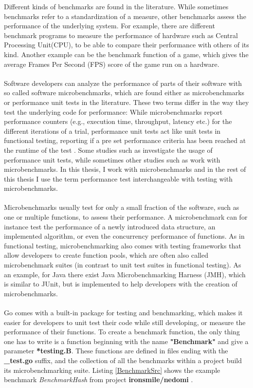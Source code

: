 \documentclass{seal_thesis}
\begin{document}
Different kinds of benchmarks are found in the literature. While sometimes benchmarks refer to a standardization of a measure, other benchmarks assess the performance of the underlying system. For example, there are different benchmark programs to measure the performance of hardware such as Central Processing Unit(CPU), to be able to compare their performance with others of its kind. Another example can be the benchmark function of a game, which gives the average Frames Per Second (FPS) score of the game run on a hardware.\\
\\
Software developers can analyze the performance of parts of their software with so called software microbenchmarks, which are found either as microbenchmarks or performance unit tests in the literature\cite{costa2019}. These two terms differ in the way they test the underlying code for performance: While microbenchmarks report performance counters (e.g., execution time, throughput, latency etc.) for the different iterations of a trial, performance unit tests act like unit tests in functional testing, reporting if a pre set performance criteria has been reached at the runtime of the test \cite{costa2019}. Some studies such as \cite{Stefan:2017:UTP:3030207.3030226}\cite{Horky:2015:UPU:2668930.2688051} investigate the usage of performance unit tests, while sometimes other studies such as \cite{Laaber:2018:EOS:3196398.3196407}\cite{rodriguez2016automatic} work with microbenchmarks. In this thesis, I work with microbenchmarks and in the rest of this thesis I use the term performance test interchangeable with testing with microbenchmarks.\\
\\
Microbenchmarks usually test for only a small fraction of the software, such as one or multiple functions, to assess their performance. A microbenchmark can for instance test the performance of a newly introduced data structure, an implemented algorithm, or even the concurrency performance of functions\cite{costa2019}. As in functional testing, microbenchmarking also comes with testing frameworks that allow developers to create function pools, which are often also called microbenchmark suites (in contrast to unit test suites in functional testing). As an example, for Java there exist Java Microbenchmarking Harness (JMH), which is similar to JUnit, but is implemented to help developers with the creation of microbenchmarks\cite{JMH}.\\
\\
Go comes with a built-in package for testing and benchmarking, which makes it easier for developers to unit test their code while still developing, or measure the performance of their functions\cite{gobench}. To create a benchmark function, the only thing one has to write is a function beginning with the name \textbf{"Benchmark"} and give a parameter \textbf{*testing.B}. These functions are defined in files ending with the \textbf{\_test.go} suffix, and the collection of all the benchmarks within a project build its microbenchmarking suite. Listing \ref{BenchmarkSrc} shows the example benchmark \textit{BenchmarkHash} from project \textbf{ironsmile/nedomi} \cite{ironsmile/nedomi}.
\end{document}
